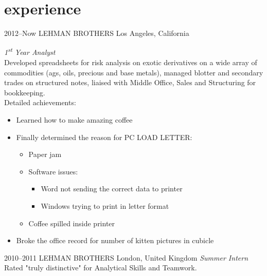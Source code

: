\section{experience}

\begin{entrylist}
\entry
{2012--Now}
{LEHMAN BROTHERS}
{Los Angeles, California}
{\emph{1\textsuperscript{st} Year Analyst} \\
Developed spreadsheets for risk analysis on exotic derivatives on a wide array of commodities (ags, oils, precious and base metals), managed blotter and secondary trades on structured notes, liaised with Middle Office, Sales and Structuring for bookkeeping. \\
Detailed achievements:
\begin{itemize}
\item Learned how to make amazing coffee
\item Finally determined the reason for \textsc{PC LOAD LETTER}:
\begin{itemize}
\item Paper jam
\item Software issues:
\begin{itemize}
\item Word not sending the correct data to printer
\item Windows trying to print in letter format
\end{itemize}
\item Coffee spilled inside printer
\end{itemize}
\item Broke the office record for number of kitten pictures in cubicle
\end{itemize}}
\entry
{2010--2011}
{LEHMAN BROTHERS}
{London, United Kingdom}
{\emph{Summer Intern} \\
Rated "truly distinctive" for Analytical Skills and Teamwork.}
\end{entrylist}